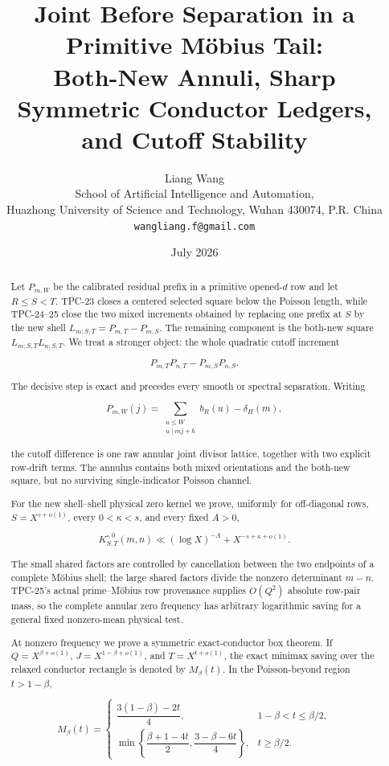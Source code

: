 \documentclass[11pt]{article}
\title{\textbf{Joint Before Separation in a Primitive M\"obius Tail:}\\
\textbf{Both-New Annuli, Sharp Symmetric Conductor Ledgers,}\\
\textbf{and Cutoff Stability}}
\author{Liang Wang\\
\small School of Artificial Intelligence and Automation,\\[-0.2em]
\small Huazhong University of Science and Technology, Wuhan 430074, P.R. China\\
\small \texttt{wangliang.f@gmail.com}}
\date{July 2026}
\theoremstyle{definition}
\theoremstyle{remark}
\begin{document}
\maketitle

\begin{abstract}
Let \(P_{m,W}\) be the calibrated residual prefix in a primitive
opened-\(d\) row and let \(R\le S<T\).  TPC-23 closes a centered
selected square below the Poisson length, while TPC-24--25 close the two mixed
increments obtained by replacing one prefix at \(S\) by the new shell
\(L_{m;S,T}=P_{m,T}-P_{m,S}\).  The remaining component is the
both-new square \(L_{m;S,T}L_{n;S,T}\).  We treat a stronger object:
the whole quadratic cutoff increment

\[
 P_{m,T}P_{n,T}-P_{m,S}P_{n,S}.
\]

The decisive step is exact and precedes every smooth or spectral
separation.  Writing

\[
 P_{m,W}(j)=
 \sum_{\substack{u\le W\\u\mid mj+h}}b_R(u)-\delta_H(m),
\]

the cutoff difference is one raw annular joint divisor lattice,
together with two explicit row-drift terms.  The annulus contains both
mixed orientations and the both-new square, but no surviving
single-indicator Poisson channel.

For the new shell--shell physical zero kernel we prove, uniformly for
off-diagonal rows, \(S=X^{s+o(1)}\), every \(0<\kappa<s\), and every
fixed \(A>0\),

\[
 K^{\square,0}_{S,T}(m,n)
 \ll (\log X)^{-A}+X^{-s+\kappa+o(1)}.
\]

The small shared factors are controlled by cancellation between the
two endpoints of a complete M\"obius shell; the large shared factors
divide the nonzero determinant \(m-n\).  TPC-25's actual
prime--M\"obius row provenance supplies \(O(Q^2)\) absolute row-pair
mass, so the complete annular zero frequency has arbitrary
logarithmic saving for a general fixed nonzero-mean physical test.

At nonzero frequency we prove a symmetric exact-conductor box theorem.
If \(Q=X^{\beta+o(1)}\), \(J=X^{1-\beta+o(1)}\), and
\(T=X^{t+o(1)}\), the exact minimax saving over the relaxed conductor
rectangle is denoted by \(M_\beta(t)\).  In the Poisson-beyond region
\(t>1-\beta\),

\[
 M_\beta(t)=
 \begin{cases}
 \dfrac{3(1-\beta)-2t}{4},
 &1-\beta<t\le\beta/2,\\[5pt]
 \displaystyle\min\left\{
 \dfrac{\beta+1-4t}{2},
 \dfrac{3-\beta-6t}{4}\right\},
 &t\ge\beta/2.
 \end{cases}
\]


\end{abstract}
\end{document}
